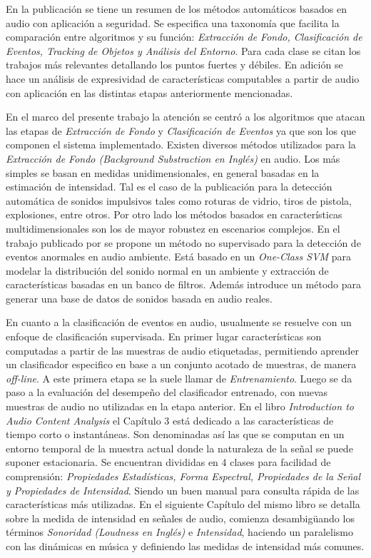 \documentclass{article}
\begin{document}
\bigskip
En la publicación \cite{crocco2014audio} se tiene un resumen de los métodos automáticos basados en audio con aplicación a seguridad. Se especifica una taxonomía que facilita la comparación entre algoritmos y su función: \textit{Extracción de Fondo, Clasificación de Eventos, Tracking de Objetos y Análisis del Entorno}. Para cada clase se citan los trabajos más relevantes detallando los puntos fuertes y débiles. En adición se hace un análisis de expresividad de características computables a partir de audio con aplicación en las distintas etapas anteriormente mencionadas. 

\bigskip
En el marco del presente trabajo la atención se centró a los algoritmos que atacan las etapas de \textit{Extracción de Fondo} y \textit{Clasificación de Eventos} ya que son los que componen el sistema implementado. Existen diversos métodos utilizados para la \textit{Extracción de Fondo (Background Substraction en Inglés)} en audio. Los más simples se basan en medidas unidimensionales, en general basadas en la estimación de intensidad. Tal es el caso de la publicación \cite{dufaux2000automatic} para la detección automática de sonidos impulsivos tales como roturas de vidrio, tiros de pistola, explosiones, entre otros. Por otro lado los métodos basados en características multidimensionales son los de mayor robustez en escenarios complejos. En el trabajo publicado por \cite{lecomte2011abnormal} se propone un método no supervisado para la detección de eventos anormales en audio ambiente. Está basado en un \textit{One-Class SVM} para modelar la distribución del sonido normal en un ambiente y extracción de características basadas en un banco de filtros. Además introduce un método para generar una base de datos de sonidos basada en audio reales.
 
\bigskip 
En cuanto a la clasificación de eventos en audio, usualmente se resuelve con un enfoque de clasificación supervisada. En primer lugar características son computadas a partir de las muestras de audio etiquetadas, permitiendo aprender un clasificador especifico en base a un conjunto acotado de muestras, de manera \textit{off-line}. A este primera etapa se la suele llamar de \textit{Entrenamiento}. Luego se da paso a la evaluación del desempeño del clasificador entrenado, con nuevas muestras de audio no utilizadas en la etapa anterior. En el libro \textit{Introduction to Audio Content Analysis} \citep{Lerch:2012:IAC:2392638} el Capítulo 3 está dedicado a las características de tiempo corto o instantáneas. Son denominadas así las que se computan en un entorno temporal de la muestra actual donde la naturaleza de la señal se puede suponer estacionaria. Se encuentran divididas en 4 clases para facilidad de comprensión: \textit{Propiedades Estadísticas, Forma Espectral, Propiedades de la Señal y Propiedades de Intensidad}. Siendo un buen manual para consulta rápida de las características más utilizadas. En el siguiente Capítulo del mismo libro se detalla sobre la medida de intensidad en señales de audio, comienza desambigüando los términos \textit{Sonoridad (Loudness en Inglés)} e \textit{Intensidad}, haciendo un paralelismo con las dinámicas en música y definiendo las medidas de intensidad más comunes.
\bigskip
\end{document}
